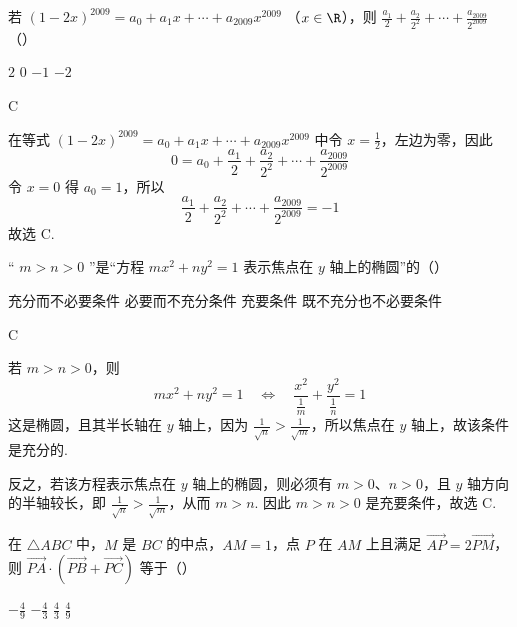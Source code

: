 \begin{problem}
若 \( \left(1-2x\right)^{2009}=a_{0}+a_{1}x+\cdots+a_{2009}x^{2009} \) （\( x\in \R \)），则 \( \frac{a_{1}}{2}+\frac{a_{2}}{2^{2}}+\cdots+\frac{a_{2009}}{2^{2009}} \)（\quad）

\choices
    {\(2\)}
    {\(0\)}
    {\(-1\)}
    {\(-2\)}

\end{problem}

\begin{answer}
C
\end{answer}

\begin{solution}
在等式
\(\left(1-2x\right)^{2009}=a_{0}+a_{1}x+\cdots+a_{2009}x^{2009}\)
中令 \(x=\frac{1}{2}\)，左边为零，因此
\[
0=a_{0}+\frac{a_{1}}{2}+\frac{a_{2}}{2^{2}}+\cdots+\frac{a_{2009}}{2^{2009}}
\]
令 \(x=0\) 得 \(a_{0}=1\)，所以
\[
\frac{a_{1}}{2}+\frac{a_{2}}{2^{2}}+\cdots+\frac{a_{2009}}{2^{2009}}=-1
\]
故选 C.
\end{solution}

\begin{problem}
“ \( m > n > 0 \) ”是“方程 \( mx^{2} + ny^{2} = 1 \) 表示焦点在 \(y\) 轴上的椭圆”的（\quad）

\choices
    {充分而不必要条件}
    {必要而不充分条件}
    {充要条件}
    {既不充分也不必要条件}

\end{problem}

\begin{answer}
C
\end{answer}

\begin{solution}
若 \(m>n>0\)，则
\[
mx^{2}+ny^{2}=1\quad\Longleftrightarrow\quad
\frac{x^{2}}{\frac{1}{m}}+\frac{y^{2}}{\frac{1}{n}}=1
\]
这是椭圆，且其半长轴在 \(y\) 轴上，因为 \(\frac{1}{\sqrt{n}}>\frac{1}{\sqrt{m}}\)，所以焦点在 \(y\) 轴上，故该条件是充分的.

反之，若该方程表示焦点在 \(y\) 轴上的椭圆，则必须有 \(m>0\)、\(n>0\)，且 \(y\) 轴方向的半轴较长，即
\(\frac{1}{\sqrt{n}}>\frac{1}{\sqrt{m}}\)，从而 \(m>n\). 因此 \(m>n>0\) 是充要条件，故选 C.
\end{solution}

\begin{problem}
在 \(\triangle ABC\) 中，\(M\) 是 \(BC\) 的中点，\(AM = 1\)，点 \(P\) 在 \(AM\) 上且满足 \(\overrightarrow{AP} = 2\overrightarrow{PM}\)，则 \(\overrightarrow{PA} \cdot \left(\overrightarrow{PB} + \overrightarrow{PC}\right)\) 等于（\quad）

\choices
    {\(-\frac{4}{9}\)}
    {\(-\frac{4}{3}\)}
    {\( \frac{4}{3} \)}
    {\( \frac{4}{9} \)}

\end{problem}

